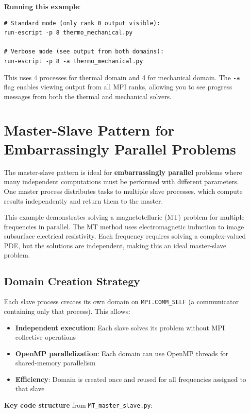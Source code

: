 \textbf{Running this example}:
\begin{verbatim}
# Standard mode (only rank 0 output visible):
run-escript -p 8 thermo_mechanical.py

# Verbose mode (see output from both domains):
run-escript -p 8 -a thermo_mechanical.py
\end{verbatim}

This uses 4 processes for thermal domain and 4 for mechanical domain. The \texttt{-a} flag enables viewing output from all MPI ranks, allowing you to see progress messages from both the thermal and mechanical solvers.

\section{Master-Slave Pattern for Embarrassingly Parallel Problems}

The master-slave pattern is ideal for \textbf{embarrassingly parallel} problems where many independent computations must be performed with different parameters. One master process distributes tasks to multiple slave processes, which compute results independently and return them to the master.

This example demonstrates solving a magnetotelluric (MT) problem for multiple frequencies in parallel. The MT method uses electromagnetic induction to image subsurface electrical resistivity. Each frequency requires solving a complex-valued PDE, but the solutions are independent, making this an ideal master-slave problem.

\subsection{Domain Creation Strategy}

Each slave process creates its own domain on \texttt{MPI.COMM\_SELF} (a communicator containing only that process). This allows:
\begin{itemize}
\item \textbf{Independent execution}: Each slave solves its problem without MPI collective operations
\item \textbf{OpenMP parallelization}: Each domain can use OpenMP threads for shared-memory parallelism
\item \textbf{Efficiency}: Domain is created once and reused for all frequencies assigned to that slave
\end{itemize}

\textbf{Key code structure} from \texttt{MT\_master\_slave.py}:

